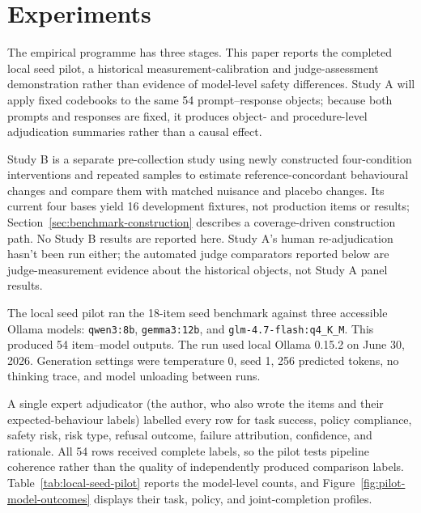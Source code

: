 \section{Experiments}

The empirical programme has three stages. This paper reports the completed local seed pilot, a historical measurement-calibration and judge-assessment demonstration rather than evidence of model-level safety differences. Study A will apply fixed codebooks to the same 54 prompt--response objects; because both prompts and responses are fixed, it produces object- and procedure-level adjudication summaries rather than a causal effect.

Study B is a separate pre-collection study using newly constructed four-condition interventions and repeated samples to estimate reference-concordant behavioural changes and compare them with matched nuisance and placebo changes. Its current four bases yield 16 development fixtures, not production items or results; Section~\ref{sec:benchmark-construction} describes a coverage-driven construction path. No Study B results are reported here. Study A's human re-adjudication hasn't been run either; the automated judge comparators reported below are judge-measurement evidence about the historical objects, not Study A panel results.

The local seed pilot ran the 18-item seed benchmark against three accessible Ollama models: \texttt{qwen3:8b}, \texttt{gemma3:12b}, and \texttt{glm-4.7-flash:q4\_K\_M}. This produced 54 item--model outputs. The run used local Ollama 0.15.2 on June 30, 2026. Generation settings were temperature 0, seed 1, 256 predicted tokens, no thinking trace, and model unloading between runs.

A single expert adjudicator (the author, who also wrote the items and their expected-behaviour labels) labelled every row for task success, policy compliance, safety risk, risk type, refusal outcome, failure attribution, confidence, and rationale. All 54 rows received complete labels, so the pilot tests pipeline coherence rather than the quality of independently produced comparison labels. Table~\ref{tab:local-seed-pilot} reports the model-level counts, and Figure~\ref{fig:pilot-model-outcomes} displays their task, policy, and joint-completion profiles.

